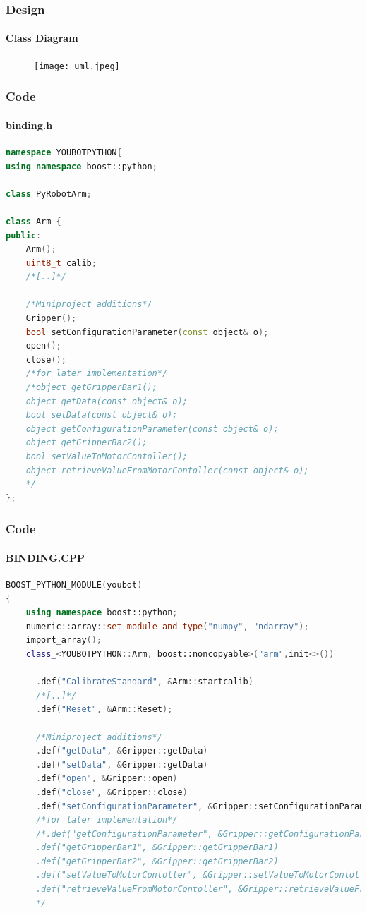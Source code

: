 \documentclass{beamer}
\begin{document}
\begin{frame}
 \frametitle{Design}
 \framesubtitle{Class Diagram}
  \begin{figure}[ht!]
  \centering
  \texttt{[image: uml.jpeg]}
  \caption{}
  \label{overflow}
  \end{figure}
 
\end{frame}


\begin{frame}[fragile]
 \frametitle{Code}
 \framesubtitle{binding.h}
\begin{lstlisting}[language=C++]
namespace YOUBOTPYTHON{
using namespace boost::python;

class PyRobotArm;

class Arm {
public:
    Arm();
    uint8_t calib;
    /*[..]*/

    /*Miniproject additions*/
    Gripper();
    bool setConfigurationParameter(const object& o);
    open();
    close();
    /*for later implementation*/
    /*object getGripperBar1();
    object getData(const object& o);
    bool setData(const object& o);
    object getConfigurationParameter(const object& o);	
    object getGripperBar2();
    bool setValueToMotorContoller();
    object retrieveValueFromMotorContoller(const object& o);
    */
};
\end{lstlisting} 
\end{frame}

\begin{frame}[fragile]
 \frametitle{Code}
 \framesubtitle{BINDING.CPP}
\begin{lstlisting}[language=C++]
BOOST_PYTHON_MODULE(youbot)
{
    using namespace boost::python;
    numeric::array::set_module_and_type("numpy", "ndarray"); 
    import_array();
    class_<YOUBOTPYTHON::Arm, boost::noncopyable>("arm",init<>())

      .def("CalibrateStandard", &Arm::startcalib)
      /*[..]*/
      .def("Reset", &Arm::Reset);

      /*Miniproject additions*/
      .def("getData", &Gripper::getData)
      .def("setData", &Gripper::getData)
      .def("open", &Gripper::open)
      .def("close", &Gripper::close)
      .def("setConfigurationParameter", &Gripper::setConfigurationParameter)
      /*for later implementation*/
      /*.def("getConfigurationParameter", &Gripper::getConfigurationParameter)
      .def("getGripperBar1", &Gripper::getGripperBar1)
      .def("getGripperBar2", &Gripper::getGripperBar2)
      .def("setValueToMotorContoller", &Gripper::setValueToMotorContoller)
      .def("retrieveValueFromMotorContoller", &Gripper::retrieveValueFromMotorContoller)
      */
\end{lstlisting} 
\end{frame}


%         


\end{document}
